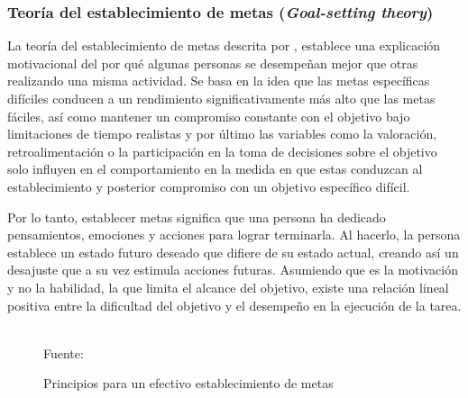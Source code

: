 \subsubsection{Teoría del establecimiento de metas (\textit{Goal-setting theory})}

La teoría del establecimiento de metas descrita por , establece una explicación motivacional
del por qué algunas personas se desempeñan mejor que otras realizando una misma actividad. Se basa en la idea
que las metas específicas difíciles conducen a un rendimiento significativamente más alto que las metas 
fáciles, así como mantener un compromiso constante con el objetivo bajo limitaciones de tiempo realistas y por
último las variables como la valoración, retroalimentación o la participación en la toma de decisiones sobre 
el objetivo solo influyen en el comportamiento en la medida en que estas conduzcan al establecimiento y 
posterior compromiso con un objetivo específico difícil.

Por lo tanto, establecer metas significa que una persona ha dedicado pensamientos, emociones y acciones para 
lograr terminarla. Al hacerlo, la persona establece un estado futuro deseado que difiere de su estado actual, 
creando así un desajuste que a su vez estimula acciones futuras. Asumiendo que es la motivación y no la 
habilidad, la que limita el alcance del objetivo, existe una relación lineal positiva entre la dificultad del 
objetivo y el desempeño en la ejecución de la tarea.

\begin{figure}[ht]
\caption{Principios para un efectivo establecimiento de metas}
\label{img:goal}
\centering
{}
\\
{\footnotesize Fuente: \citeA<basada en>{Locke1968}}
\end{figure}

